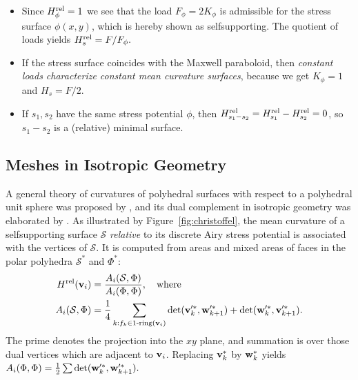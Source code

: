 \documentclass[review]{acmsiggraph}
\def\rel{{\mathord{{\rm rel}}}}
\def\SS{{\mathcal S}}
\begin{document}
\begin{itemize}\itemsep-\parsep

\item Since $H^\rel_\phi=1$ we see that the load $F_\phi=2K_\phi$ is 
admissible for the stress surface $\phi(x,y)$, which is hereby shown as 
self\dash supporting. The quotient of loads yields
	$
	 H_s^\rel = F/F_\phi.
	$

\item If the stress surface coincides with the Maxwell paraboloid, then 
{\em constant loads characterize constant mean curvature surfaces}, 
because we get $K_\phi=1$ and $H_s=F/2$.

\item If $s_1,s_2$ have the same stress potential $\phi$, then 
$H^\rel_{s_1-s_2}=H^\rel_{s_1}-H^\rel_{s_2}=0$, so $s_1-s_2$ is a 
(relative) minimal surface.

\end{itemize}



\subsection{Meshes in Isotropic Geometry} \label{sec:discrete}

A general theory of curvatures of polyhedral surfaces with respect to a 
polyhedral unit sphere was proposed by 
\cite{Pottmann2007b,bobenko-2010-ct}, and its dual complement in isotropic 
geometry was elaborated by \cite{Pottmann2007}. As illustrated by 
Figure~\ref{fig:christoffel}, the mean curvature of a self\dash supporting 
surface $\SS$ {\em relative} to its discrete Airy stress potential is 
associated with the vertices of $\SS$. It is computed from areas and mixed 
areas of faces in the polar polyhedra $\SS^*$ and $\Phi^*$:
	\begin{align*}
	H^\rel(\vw_i)
	&= {A_i(\SS,\Phi) \over A_i(\Phi,\Phi)},
	\quad\text{where}
	\\
		A_i (\SS,\Phi)
	&=
		\frac{1}{4}
		\sum_{k:f_k\in \text{1-ring}(\vw_i)}
		\det(\vw'^*_k, \ww'^*_{k+1})
		+ \det(\ww'^*_k, \vw'^*_{k+1}).
	\end{align*}
 The prime denotes the projection into the $xy$ plane, and summation is
over those dual vertices which are adjacent to ${\mathbf v}_i$.
Replacing ${\mathbf v}_k^*$ by ${\mathbf w}_k^*$ yields
	$
		A_i (\Phi,\Phi)
	=
	\frac{1}{2}
		\sum
		\det({\mathbf w}'^*_k, {\mathbf w}'^*_{k+1}).
	$
\end{document}
